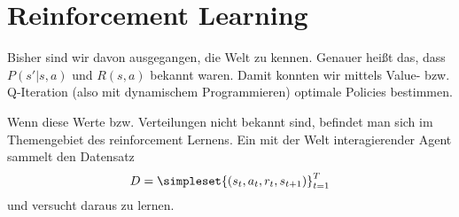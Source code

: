 \documentclass[ngerman]{../LaTeX-Templates/Paper/paper}
\begin{document}

















\section{Reinforcement Learning}
Bisher sind wir davon ausgegangen, die Welt zu kennen. Genauer heißt das, dass $P(s'|s,a)$ und $R(s,a)$ bekannt waren. Damit konnten wir mittels Value- bzw. Q-Iteration (also mit dynamischem Programmieren) optimale Policies bestimmen.

Wenn diese Werte bzw. Verteilungen nicht bekannt sind, befindet man sich im Themengebiet des reinforcement Lernens.
Ein mit der Welt interagierender Agent sammelt den Datensatz
\begin{equation*}
	D=\simpleset{(s_t,a_t,r_t,s_{t+1})}_{t=1}^T
\end{equation*}
und versucht daraus zu lernen.
\end{document}
